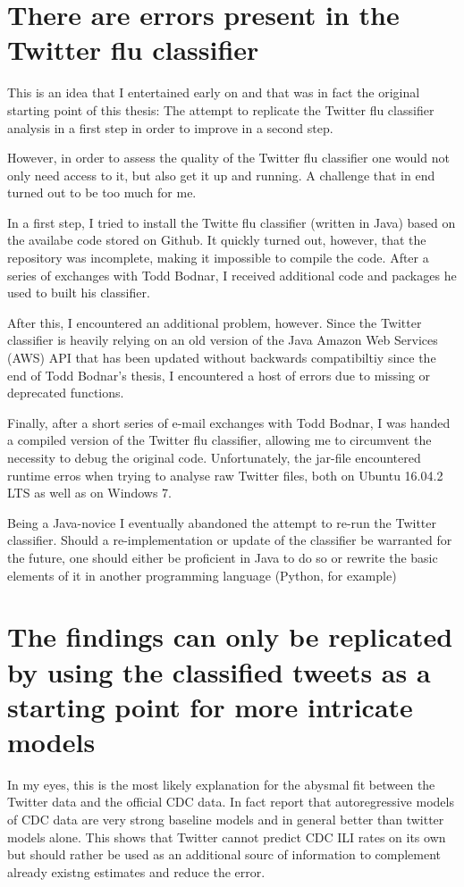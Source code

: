 \documentclass[11pt, a4paper]{report}\usepackage[]{graphicx}\usepackage[]{color}
\begin{document}
\section{There are errors present in the Twitter flu classifier}
This is an idea that I entertained early on and that was in fact the original starting point of this thesis: The attempt to replicate the Twitter flu classifier analysis in a first step in order to improve in a second step.\newline

However, in order to assess the quality of the Twitter flu classifier one would not only need access to it, but also get it up and running. A challenge that in end turned out to be too much for me.\newline

In a first step, I tried to install the Twitte flu classifier (written in Java) based on the availabe code stored on Github. It quickly turned out, however, that the repository was incomplete, making it impossible to compile the code. After a series of exchanges with Todd Bodnar, I received additional code and packages he used to built his classifier.\newline

After this, I encountered an additional problem, however. Since the Twitter classifier is heavily relying on an old version of the Java Amazon Web Services (AWS) API that has been updated without backwards compatibiltiy since the end of Todd Bodnar's thesis, I encountered a host of errors due to missing or deprecated functions.\newline

Finally, after a short series of e-mail exchanges with Todd Bodnar, I was handed a compiled version of the Twitter flu classifier, allowing me to circumvent the necessity to debug the original code. Unfortunately, the jar-file encountered runtime erros when trying to analyse raw Twitter files, both on Ubuntu 16.04.2 LTS as well as on Windows 7.\newline

Being a Java-novice I eventually abandoned the attempt to re-run the Twitter classifier. Should a re-implementation or update of the classifier be warranted for the future, one should either be proficient in Java to do so or rewrite the basic elements of it in another programming language (Python, for example)

\section{The findings can only be replicated by using the classified tweets as a starting point for more intricate models}
In my eyes, this is the most likely explanation for the abysmal fit between the Twitter data and the official CDC data. In fact \citep{paul_worldwide_2015} report that autoregressive models of CDC data are very strong baseline models and in general better than twitter models alone. This shows that Twitter cannot predict CDC ILI rates on its own but should rather be used as an additional sourc of information to complement already existng estimates and reduce the error.
\end{document}
